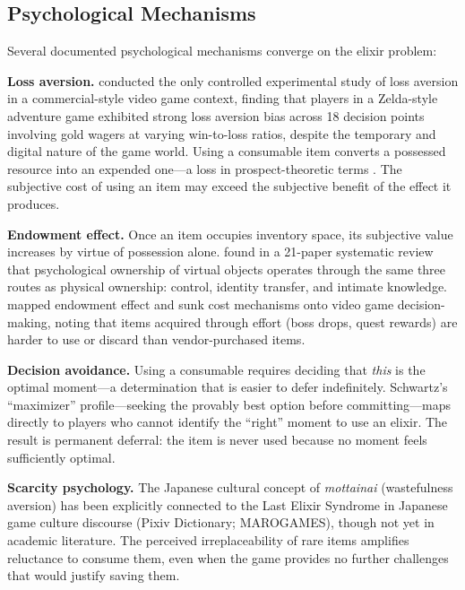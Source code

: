 \documentclass[12pt]{article}
\begin{document}
\subsection{Psychological Mechanisms}

Several documented psychological mechanisms converge on the elixir problem:

\textbf{Loss aversion.} \citet{Phillips2020} conducted the only controlled experimental study of loss aversion in a commercial-style video game context, finding that players in a Zelda-style adventure game exhibited strong loss aversion bias across 18 decision points involving gold wagers at varying win-to-loss ratios, despite the temporary and digital nature of the game world. Using a consumable item converts a possessed resource into an expended one---a loss in prospect-theoretic terms \citep{Kahneman1979}. The subjective cost of using an item may exceed the subjective benefit of the effect it produces.

\textbf{Endowment effect.} Once an item occupies inventory space, its subjective value increases by virtue of possession alone. \citet{Krauss2025} found in a 21-paper systematic review that psychological ownership of virtual objects operates through the same three routes as physical ownership: control, identity transfer, and intimate knowledge. \citet{Toh2021} mapped endowment effect and sunk cost mechanisms onto video game decision-making, noting that items acquired through effort (boss drops, quest rewards) are harder to use or discard than vendor-purchased items.

\textbf{Decision avoidance.} Using a consumable requires deciding that \textit{this} is the optimal moment---a determination that is easier to defer indefinitely. Schwartz's \citeyearpar{Schwartz2004} ``maximizer'' profile---seeking the provably best option before committing---maps directly to players who cannot identify the ``right'' moment to use an elixir. The result is permanent deferral: the item is never used because no moment feels sufficiently optimal.

\textbf{Scarcity psychology.} The Japanese cultural concept of \textit{mottainai} (wastefulness aversion) has been explicitly connected to the Last Elixir Syndrome in Japanese game culture discourse (Pixiv Dictionary; MAROGAMES), though not yet in academic literature. The perceived irreplaceability of rare items amplifies reluctance to consume them, even when the game provides no further challenges that would justify saving them.
\end{document}
